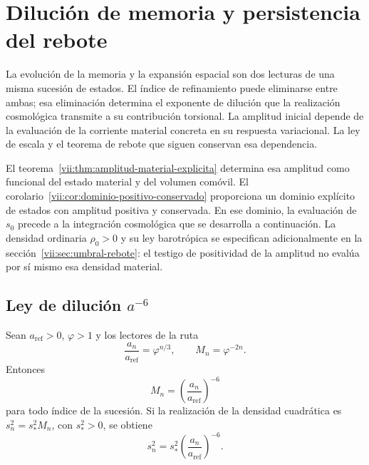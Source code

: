
\section{Dilución de memoria y persistencia del rebote}
\label{vii:sec:dilucion-rebote}

La evolución de la memoria y la expansión espacial son dos lecturas de
una misma sucesión de estados. El índice de refinamiento puede eliminarse
entre ambas; esa eliminación determina el exponente de dilución que la
realización cosmológica transmite a su contribución torsional.
La amplitud inicial depende de la evaluación de la corriente material
concreta en su respuesta variacional. La ley de escala y el teorema
de rebote que siguen conservan esa dependencia.

El teorema~\ref{vii:thm:amplitud-material-explicita} determina esa
amplitud como funcional del estado material y del volumen comóvil.
El corolario~\ref{vii:cor:dominio-positivo-conservado} proporciona
un dominio explícito de estados con amplitud positiva y conservada.
En ese dominio, la evaluación de \(s_0\) precede a la integración
cosmológica que se desarrolla a continuación. La densidad ordinaria
\(\rho_0>0\) y su ley barotrópica se especifican adicionalmente en la
sección~\ref{vii:sec:umbral-rebote}: el testigo de positividad de la
amplitud no evalúa por sí mismo esa densidad material.

\subsection{Ley de dilución \(a^{-6}\)}
\label{vii:sec:dilucion}

\begin{proposition}
\label{vii:prop:dilucion}
Sean \(a_{\mathrm{ref}}>0\), \(\varphi>1\) y los lectores de la ruta
\[
 \frac{a_n}{a_{\mathrm{ref}}}=\varphi^{n/3},\qquad
 M_n=\varphi^{-2n}.
\]
Entonces
\[
 M_n=\left(\frac{a_n}{a_{\mathrm{ref}}}\right)^{-6}
\]
para todo índice de la sucesión. Si la realización de la densidad
cuadrática es \(s_n^2=s_*^2M_n\), con \(s_*^2>0\), se obtiene
\[
 s_n^2=s_*^2\left(\frac{a_n}{a_{\mathrm{ref}}}\right)^{-6}.
\]
\end{proposition}


